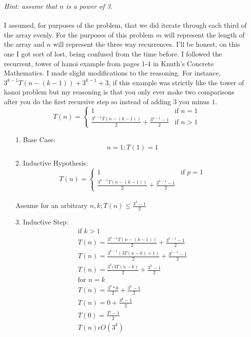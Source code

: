 \documentclass[paper=a4,fontsize=11pt]{article}
\begin{document}
\begin{enumerate}
\textit{Hint: assume that $n$ is a power of 3}.\\\\
I assumed, for purposes of the problem, that we did iterate through each third of the array evenly. For the purposes of this problem $m$ will represent the length of the array and $n$ will represent the three way recurrences. I'll be honest, on this one I got sort of lost, being confused from the time before. I followed the recurrent, tower of hanoi example from pages 1-4 in Knuth's Concrete Mathematics. I made slight modifications to the reasoning. For instance, $3^{k-1}T(n-(k-1)) + 3^{k-1} + 3$, if this example was strictly like the tower of hanoi problem but my reasoning is that you only ever make two comparisons after you do the first recursive step so instead of adding $3$ you minus $1$.
\[
  T(n) =
    \begin{cases}
        1 & \text{if $n = 1$} \\
        \frac{3^{k-1}T(n-(k-1))}{2} + \frac{3^{k-1} - 1}{2} & \text{if $n > 1$}
    \end{cases}
\]
\begin{enumerate}
\item[1.] Base Case:\\
$$n = 1; T(1) = 1$$
\item[2.] Inductive Hypothesis:\\
\[
  T(n) =
    \begin{cases}
        1 & \text{if $p = 1$} \\
        \frac{3^{k-1}T(n-(k-1))}{2} + \frac{3^{k-1} - 1}{2}
    \end{cases}
\]
\\Assume for an arbitrary $n,k; T(n) \leq \frac{3^k-1}{2}$
\item[3.] Inductive Step:
\begin{gather*}
\text{if $k > 1$}\\
T(n) = \frac{3^{k-1}T(n-(k-1))}{2} + \frac{3^{k-1} - 1}{2}\\
T(n) = \frac{3^{k-1}(3T(n-k)+ 1)}{2} + \frac{3^{j-1} - 1}{2}\\
T(n) = \frac{3^{k}(3T(n-k)}{2} + \frac{3^{k} - 1}{2}\\
\text{for $n = k$}\\
T(n) = \frac{3^{k}*0}{2} + \frac{3^{k} - 1}{2}\\
T(n) = 0 + \frac{3^{k} - 1}{2}\\
T(0) = \frac{3^{k} - 1}{2}\\
T(n) \epsilon O(3^k)\\
\end{gather*}
\end{enumerate}
\end{enumerate}
\end{document}
